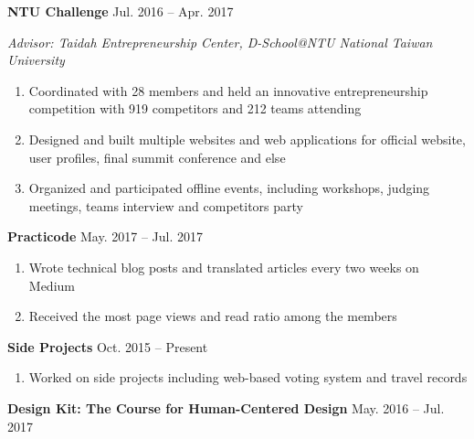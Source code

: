 \documentclass[12pt]{article}
\begin{document}
	\textbf{NTU Challenge} \hfill Jul. 2016 -- Apr. 2017

	\textit{Advisor: Taidah Entrepreneurship Center, D-School@NTU \hfill National Taiwan University}

	\begin{enumerate}

		\item Coordinated with 28 members and held an innovative entrepreneurship competition with 919 competitors and 212 teams attending

		\item Designed and built multiple websites and web applications for official website, user profiles, final summit conference and else

		\item Organized and participated offline events, including workshops, judging meetings, teams interview and competitors party

	\end{enumerate}

	\vspace{0.5em}

	\textbf{Practicode} \hfill May. 2017 -- Jul. 2017

	\begin{enumerate}

		\item Wrote technical blog posts and translated articles every two weeks on Medium

		\item Received the most page views and read ratio among the members

	\end{enumerate}

	\vspace{0.5em}

	\textbf{Side Projects} \hfill Oct. 2015 -- Present

	\begin{enumerate}

		\item Worked on side projects including web-based voting system and travel records

	\end{enumerate}

	\vspace{0.5em}

	\textbf{Design Kit: The Course for Human-Centered Design} \hfill May. 2016 -- Jul. 2017
\end{document}
